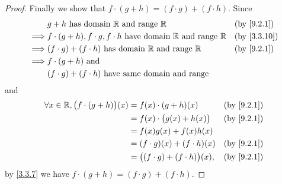 \begin{proof}
  Finally we show that \(f \cdot (g + h) = (f \cdot g) + (f \cdot h)\).
  Since
  \begin{align*}
             & g + h \text{ has domain } \R \text{ and range } \R                                   &  & \by{9.2.1}  \\
    \implies & f \cdot (g + h), f \cdot g, f \cdot h  \text{ have domain } \R \text{ and range } \R &  & \by{3.3.10} \\
    \implies & (f \cdot g) + (f \cdot h)  \text{ has domain } \R \text{ and range } \R              &  & \by{9.2.1}  \\
    \implies & f \cdot (g + h) \text{ and }                                                                          \\
             & (f \cdot g) + (f \cdot h) \text{ have same domain and range}
  \end{align*}
  and
  \begin{align*}
    \forall x \in \R, \big(f \cdot (g + h)\big)(x) & = f(x) \cdot (g + h)(x)                   &  & \by{9.2.1} \\
                                                   & = f(x) \cdot \big(g(x) + h(x)\big)        &  & \by{9.2.1} \\
                                                   & = f(x)g(x) + f(x)h(x)                                     \\
                                                   & = (f \cdot g)(x) + (f \cdot h)(x)         &  & \by{9.2.1} \\
                                                   & = \big((f \cdot g) + (f \cdot h)\big)(x), &  & \by{9.2.1}
  \end{align*}
  by \cref{3.3.7} we have \(f \cdot (g + h) = (f \cdot g) + (f \cdot h)\).
\end{proof}
